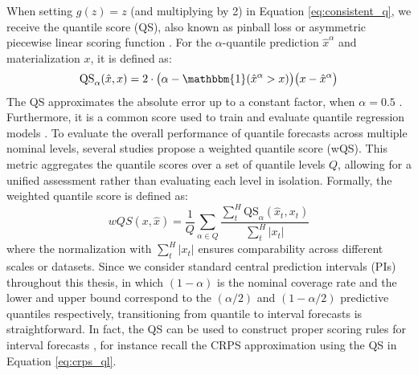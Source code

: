 \documentclass[a4paper,oneside,bibliography=totoc]{scrbook}
\begin{document}
When setting $g(z)=z$ (and multiplying by 2) in Equation \ref{eq:consistent_q}, we receive the quantile score (QS), also known as pinball loss or asymmetric piecewise linear scoring function \cite{koenker_regression_1978, gneiting_probabilistic_2007}.
For the $\alpha$-quantile prediction $\hat{x}^{\alpha}$ and materialization $x$, it is defined as: 
\begin{equation}
    \text{QS}_\alpha(\hat{x}, x) = 2 \cdot \big(\alpha - \mathbbm{1}(\hat{x}^{\alpha}>x)\big)\big(x-\hat{x}^{\alpha}\big)
    \label{eq:QS}
\end{equation}
The QS approximates the absolute error up to a constant factor, when $\alpha=0.5$ \cite{gneiting_probabilistic_2014}.
Furthermore, it is a common score used to train and evaluate quantile regression models \cite{koenker_regression_1978, koenker_quantile_2005}.
To evaluate the overall performance of quantile forecasts across multiple nominal levels, several studies \cite{gasthaus_probabilistic_2019, chen_probabilistic_2019, bergsma_c2far_2022, sprangers_parameter-efficient_2023} propose a weighted quantile score (wQS). This metric aggregates the quantile scores over a set of quantile levels $Q$, allowing for a unified assessment rather than evaluating each level in isolation.
Formally, the weighted quantile score is defined as:
\begin{equation}
    wQS(x, \hat{x}) = \frac{1}{Q} \sum_{\alpha \in Q} \frac{\sum_t^H\text{QS}_\alpha(\hat{x}_t, x_t)}{\sum_t^H |x_t|}
    \label{eq:wQS}
\end{equation}
where the normalization with $\sum_t^H |x_t|$ ensures comparability across different scales or datasets.
Since we consider standard central prediction intervals (PIs) throughout this thesis, in which $(1 - \alpha)$ is the nominal coverage rate and the lower and upper bound correspond to the $(\alpha/2)$ and $(1 - \alpha/2)$ predictive quantiles respectively, transitioning from quantile to interval forecasts is straightforward. %
In fact, the QS can be used to construct proper scoring rules for interval forecasts \cite{gneiting_probabilistic_2014, cervera_proper_1996}, for instance recall the CRPS approximation using the QS in Equation \ref{eq:crps_ql}. 
\end{document}
